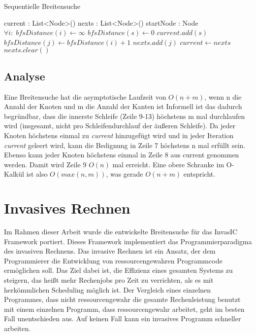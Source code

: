 \begin{algorithm}
	\caption{Sequentielle Breitensuche}
	\label{alg:sequential_bfs}
	\begin{algorithmic}[1]
		\State current : List<Node>()
		\State nexts : List<Node>()
		\State startNode : Node
		\State  $\forall i: \; bfsDistance(i) \gets \infty$
		\State $bfsDistance(s) \gets 0$
		\State $current.add(s)$
						\State $bfsDistance(j) \gets bfsDistance(i) + 1$
						\State $nexts.add(j)$
					\EndIf
				\EndFor
			\EndFor
			\State $current \gets nexts$
			\State $nexts.clear()$
		\EndWhile
	\end{algorithmic}
\end{algorithm}


\subsection{Analyse} %
\label{sub:analyse}
Eine Breitensuche hat die asymptotische Laufzeit von $O(n + m)$, wenn n die Anzahl der Knoten und m die Anzahl der Kanten ist Informell ist das dadurch begründbar, dass die innerste Schleife (Zeile 9-13) höchstens m mal durchlaufen wird (insgesamt, nicht pro Schleifendurchlauf der äußeren Schleife). Da jeder Knoten höchstens einmal zu \textit{current} hinzugefügt wird und in jeder Iteration \textit{current} geleert wird, kann die Bedignung in Zeile 7 höchstens n mal erfüllt sein. Ebenso kann jeder Knoten höchstens einmal in Zeile 8 aus current genommen werden. Damit wird Zeile 9 $O(n)$ mal erreicht. Eine obere Schranke im O-Kalkül ist also $O(max(n,m))$, was gerade $O(n + m)$ entspricht.


\section{Invasives Rechnen} %
\label{sec:invasives_rechnen}
Im Rahmen dieser Arbeit wurde die entwickelte Breitensuche für das InvasIC Framework\cite{SWB-367212986} portiert. Dieses Framework implementiert das Programmierparadigma des invasiven Rechnens. Das invasive Rechnen ist ein Ansatz, der dem Programmierer die Entwicklung von ressourcengewahren Programmcode ermöglichen soll. Das Ziel dabei ist, die Effizienz eines gesamten Systems zu steigern, das heißt mehr Rechenjobs pro Zeit zu verrichten, als es mit herkömmlichen Scheduling möglich ist. Der Vergleich eines einzelnen Programmes, dass nicht ressourcengewahr die gesamte Rechenleistung benutzt mit einem einzelnen Programm, dass ressourcengewahr arbeitet, geht im besten Fall unentschieden aus. Auf keinen Fall kann ein invasives Programm schneller arbeiten. %

